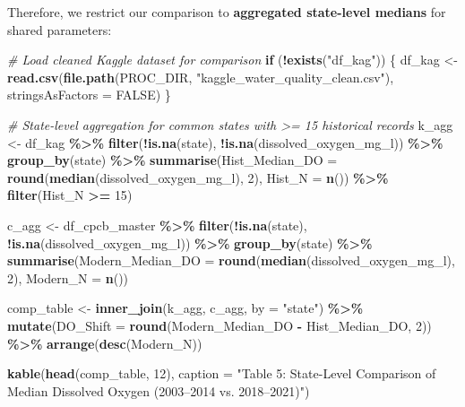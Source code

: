 \documentclass[
]{article}
\newenvironment{Shaded}{\begin{snugshade}}{\end{snugshade}}
\newcommand{\AttributeTok}[1]{\textcolor[rgb]{0.13,0.29,0.53}{#1}}
\newcommand{\CommentTok}[1]{\textcolor[rgb]{0.56,0.35,0.01}{\textit{#1}}}
\newcommand{\ConstantTok}[1]{\textcolor[rgb]{0.56,0.35,0.01}{#1}}
\newcommand{\ControlFlowTok}[1]{\textcolor[rgb]{0.13,0.29,0.53}{\textbf{#1}}}
\newcommand{\DecValTok}[1]{\textcolor[rgb]{0.00,0.00,0.81}{#1}}
\newcommand{\FunctionTok}[1]{\textcolor[rgb]{0.13,0.29,0.53}{\textbf{#1}}}
\newcommand{\NormalTok}[1]{#1}
\newcommand{\OtherTok}[1]{\textcolor[rgb]{0.56,0.35,0.01}{#1}}
\newcommand{\SpecialCharTok}[1]{\textcolor[rgb]{0.81,0.36,0.00}{\textbf{#1}}}
\newcommand{\StringTok}[1]{\textcolor[rgb]{0.31,0.60,0.02}{#1}}
\begin{document}
Therefore, we restrict our comparison to \textbf{aggregated state-level
medians} for shared parameters:

\begin{Shaded}
\begin{Highlighting}[]
\CommentTok{\# Load cleaned Kaggle dataset for comparison}
\ControlFlowTok{if}\NormalTok{ (}\SpecialCharTok{!}\FunctionTok{exists}\NormalTok{(}\StringTok{"df\_kag"}\NormalTok{)) \{}
\NormalTok{  df\_kag }\OtherTok{\textless{}{-}} \FunctionTok{read.csv}\NormalTok{(}\FunctionTok{file.path}\NormalTok{(PROC\_DIR, }\StringTok{"kaggle\_water\_quality\_clean.csv"}\NormalTok{), }\AttributeTok{stringsAsFactors =} \ConstantTok{FALSE}\NormalTok{)}
\NormalTok{\}}

\CommentTok{\# State{-}level aggregation for common states with \textgreater{}= 15 historical records}
\NormalTok{k\_agg }\OtherTok{\textless{}{-}}\NormalTok{ df\_kag }\SpecialCharTok{\%\textgreater{}\%} 
  \FunctionTok{filter}\NormalTok{(}\SpecialCharTok{!}\FunctionTok{is.na}\NormalTok{(state), }\SpecialCharTok{!}\FunctionTok{is.na}\NormalTok{(dissolved\_oxygen\_mg\_l)) }\SpecialCharTok{\%\textgreater{}\%} 
  \FunctionTok{group\_by}\NormalTok{(state) }\SpecialCharTok{\%\textgreater{}\%} 
  \FunctionTok{summarise}\NormalTok{(}\AttributeTok{Hist\_Median\_DO =} \FunctionTok{round}\NormalTok{(}\FunctionTok{median}\NormalTok{(dissolved\_oxygen\_mg\_l), }\DecValTok{2}\NormalTok{), }\AttributeTok{Hist\_N =} \FunctionTok{n}\NormalTok{()) }\SpecialCharTok{\%\textgreater{}\%} 
  \FunctionTok{filter}\NormalTok{(Hist\_N }\SpecialCharTok{\textgreater{}=} \DecValTok{15}\NormalTok{)}

\NormalTok{c\_agg }\OtherTok{\textless{}{-}}\NormalTok{ df\_cpcb\_master }\SpecialCharTok{\%\textgreater{}\%} 
  \FunctionTok{filter}\NormalTok{(}\SpecialCharTok{!}\FunctionTok{is.na}\NormalTok{(state), }\SpecialCharTok{!}\FunctionTok{is.na}\NormalTok{(dissolved\_oxygen\_mg\_l)) }\SpecialCharTok{\%\textgreater{}\%} 
  \FunctionTok{group\_by}\NormalTok{(state) }\SpecialCharTok{\%\textgreater{}\%} 
  \FunctionTok{summarise}\NormalTok{(}\AttributeTok{Modern\_Median\_DO =} \FunctionTok{round}\NormalTok{(}\FunctionTok{median}\NormalTok{(dissolved\_oxygen\_mg\_l), }\DecValTok{2}\NormalTok{), }\AttributeTok{Modern\_N =} \FunctionTok{n}\NormalTok{())}

\NormalTok{comp\_table }\OtherTok{\textless{}{-}} \FunctionTok{inner\_join}\NormalTok{(k\_agg, c\_agg, }\AttributeTok{by =} \StringTok{"state"}\NormalTok{) }\SpecialCharTok{\%\textgreater{}\%} 
  \FunctionTok{mutate}\NormalTok{(}\AttributeTok{DO\_Shift =} \FunctionTok{round}\NormalTok{(Modern\_Median\_DO }\SpecialCharTok{{-}}\NormalTok{ Hist\_Median\_DO, }\DecValTok{2}\NormalTok{)) }\SpecialCharTok{\%\textgreater{}\%} 
  \FunctionTok{arrange}\NormalTok{(}\FunctionTok{desc}\NormalTok{(Modern\_N))}

\FunctionTok{kable}\NormalTok{(}\FunctionTok{head}\NormalTok{(comp\_table, }\DecValTok{12}\NormalTok{), }\AttributeTok{caption =} \StringTok{"Table 5: State{-}Level Comparison of Median Dissolved Oxygen (2003–2014 vs. 2018–2021)"}\NormalTok{)}
\end{Highlighting}
\end{Shaded}
\end{document}
